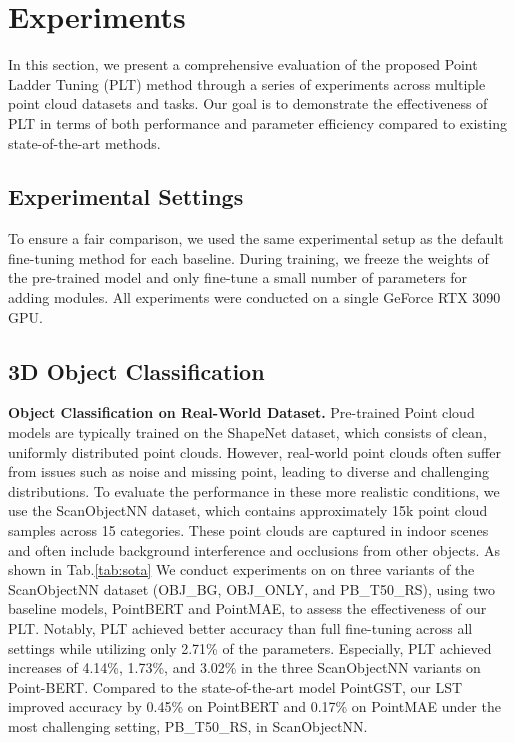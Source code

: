 

\section{Experiments}
\label{sec:experiments}
In this section, we present a comprehensive evaluation of the proposed Point Ladder Tuning (PLT) method through a series of experiments across multiple point cloud datasets and tasks. Our goal is to demonstrate the effectiveness of PLT in terms of both performance and parameter efficiency compared to existing state-of-the-art methods.
\subsection{Experimental Settings}
To ensure a fair comparison, we used the same experimental setup as the default fine-tuning method\cite{zha2023instance, zhou2024dynamic} for each baseline. During training, we freeze the weights of the pre-trained model and only fine-tune a small number of parameters for adding modules. All experiments were conducted on a single GeForce RTX 3090 GPU.

\subsection{3D Object Classification}
\label{sec:classification}
\textbf{Object Classification on Real-World Dataset.} Pre-trained Point cloud models are typically trained on the ShapeNet dataset\cite{chang2015shapenet}, which consists of clean, uniformly distributed point clouds. However, real-world point clouds often suffer from issues such as noise and missing point, leading to diverse and challenging distributions. To evaluate the performance in these more realistic conditions, we use the ScanObjectNN dataset\cite{uy2019revisiting}, which contains approximately 15k point cloud samples across 15 categories. These point clouds are captured in indoor scenes and often include background interference and occlusions from other objects. As shown in Tab.\ref{tab:sota} We conduct experiments on on three variants of the ScanObjectNN dataset\cite{uy2019revisiting} (OBJ\_BG, OBJ\_ONLY, and PB\_T50\_RS), using two baseline models, PointBERT\cite{yu2022point} and PointMAE\cite{pang2022masked}, to assess the effectiveness of our PLT. Notably, PLT achieved better accuracy than full fine-tuning across all settings while utilizing only 2.71\% of the parameters. Especially, PLT achieved increases of 4.14\%, 1.73\%, and 3.02\% in the three ScanObjectNN\cite{uy2019revisiting} variants on Point-BERT. Compared to the state-of-the-art model PointGST, our LST improved accuracy by 0.45\% on PointBERT\cite{yu2022point} and 0.17\% on PointMAE\cite{pang2022masked} under the most challenging setting, PB\_T50\_RS, in ScanObjectNN\cite{uy2019revisiting}.

